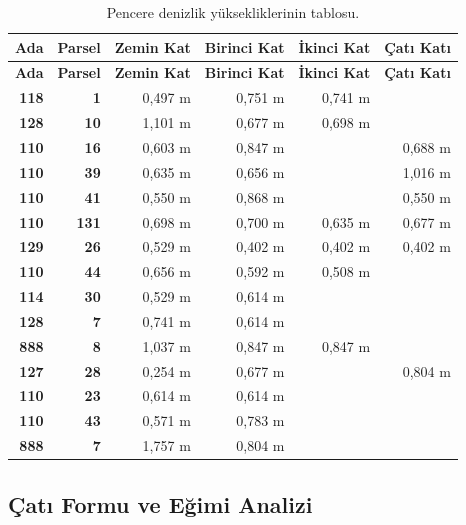 \documentclass[12pt,turkish,a4paperpaper,]{report}
\begin{document}
\begin{longtable}[]{@{}rrrrrr@{}}
\caption{Pencere denizlik yüksekliklerinin tablosu.}\tabularnewline
\toprule
\textbf{Ada} & \textbf{Parsel} & \textbf{Zemin Kat} & \textbf{Birinci
Kat} & \textbf{İkinci Kat} & \textbf{Çatı Katı}\tabularnewline
\midrule
\endfirsthead
\toprule
\textbf{Ada} & \textbf{Parsel} & \textbf{Zemin Kat} & \textbf{Birinci
Kat} & \textbf{İkinci Kat} & \textbf{Çatı Katı}\tabularnewline
\midrule
\endhead
\textbf{118} & \textbf{1} & 0,497 m & 0,751 m & 0,741 m &\tabularnewline
\textbf{128} & \textbf{10} & 1,101 m & 0,677 m & 0,698 m
&\tabularnewline
\textbf{110} & \textbf{16} & 0,603 m & 0,847 m & & 0,688
m\tabularnewline
\textbf{110} & \textbf{39} & 0,635 m & 0,656 m & & 1,016
m\tabularnewline
\textbf{110} & \textbf{41} & 0,550 m & 0,868 m & & 0,550
m\tabularnewline
\textbf{110} & \textbf{131} & 0,698 m & 0,700 m & 0,635 m & 0,677
m\tabularnewline
\textbf{129} & \textbf{26} & 0,529 m & 0,402 m & 0,402 m & 0,402
m\tabularnewline
\textbf{110} & \textbf{44} & 0,656 m & 0,592 m & 0,508 m
&\tabularnewline
\textbf{114} & \textbf{30} & 0,529 m & 0,614 m & &\tabularnewline
\textbf{128} & \textbf{7} & 0,741 m & 0,614 m & &\tabularnewline
\textbf{888} & \textbf{8} & 1,037 m & 0,847 m & 0,847 m &\tabularnewline
\textbf{127} & \textbf{28} & 0,254 m & 0,677 m & & 0,804
m\tabularnewline
\textbf{110} & \textbf{23} & 0,614 m & 0,614 m & &\tabularnewline
\textbf{110} & \textbf{43} & 0,571 m & 0,783 m & &\tabularnewline
\textbf{888} & \textbf{7} & 1,757 m & 0,804 m & &\tabularnewline
\bottomrule
\end{longtable}

\newpage

\hypertarget{uxe7atux131-formu-ve-eux11fimi-analizi}{%
\subsection{Çatı Formu ve Eğimi
Analizi}\label{uxe7atux131-formu-ve-eux11fimi-analizi}}
\end{document}
